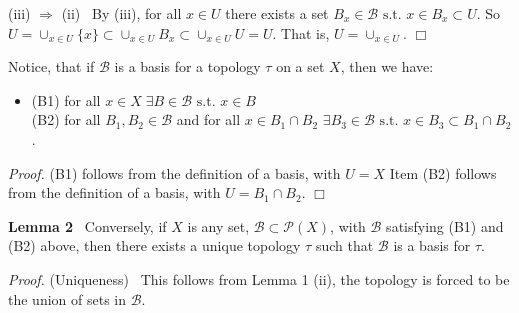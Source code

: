 \documentclass[12pt]{article}
\newcommand{\pset}[1]{ \mathcal{P}(#1) }
\newcommand{\st}[0]{ \textrm{ s.t. } }
\newcommand{\rimply}[0] { \Rightarrow }
\newcommand{\B}[0] { \mathcal{B} }
\begin{document}
\begin{flushleft}
\begin{flushleft}
 (iii) $\rimply$ (ii) \ By (iii), for all $x \in U$  there exists a set $B_x \in \B \st x \in B_x \subset U $.  So $U = \cup_{x \in U} \{x\} \subset \cup_{x \in U} B_x \subset \cup_{x \in U} U = U$.  That is,  $U = \cup_{x \in U}$. $ \Box$\end{flushleft}\end{flushleft}Notice, that if $\B$ is a basis for a topology $\tau$ on a set $X$, then we have:\begin{itemize}
\item[] 
            (B1) for all $x \in X \; \exists B \in \B \st x \in B$ \\
            (B2) for all $B_1, B_2 \in \B$ and for all $x \in B_1 \cap B_2$ $\exists B_3 \in \B \st x \in B_3 \subset B_1 \cap B_2$.
        \end{itemize}\begin{flushleft} 
 \emph{Proof.  } (B1) follows from the definition of a basis, with $U = X$ 
Item  (B2) follows from the definition of a basis, with $U = B_1 \cap B_2$.
$ \Box$  \end{flushleft}\begin{flushleft} 
 { \bf Lemma 2 } \ Conversely, if $X$ is any set, $\B \subset \pset{X}$, with $\B$ satisfying (B1) and (B2) above, then there exists a unique topology $\tau$ such that $\B$ is a basis for $\tau$.\begin{flushleft} 
 \emph{Proof.  }(Uniqueness) \ This follows from Lemma 1 (ii), the topology is forced to be the union of sets in $\B$. \\ 


\end{flushleft}
\end{flushleft}
\end{document}
